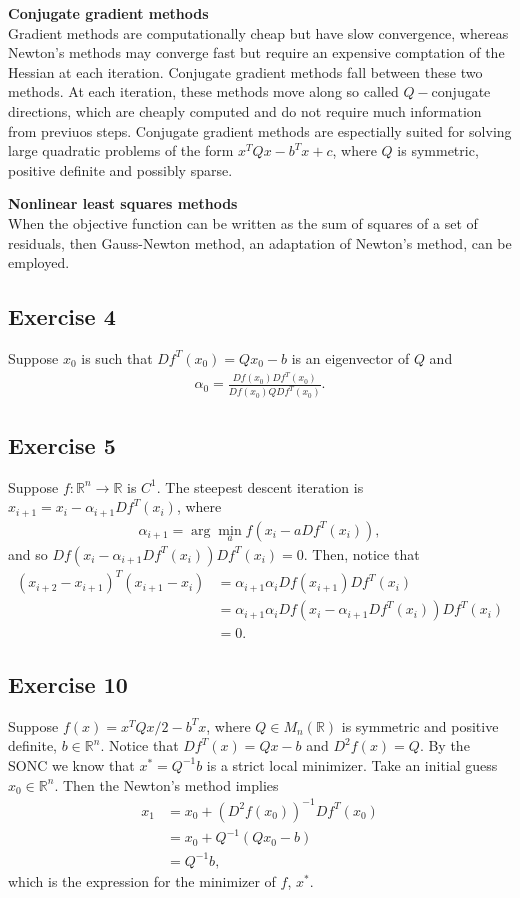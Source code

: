 \documentclass[11.5pt, letterpaper, bibtotoc,
    tablecaptionabove, figurecaptionabove]{article}
\begin{document}
\textbf{Conjugate gradient methods}\\
Gradient methods are computationally cheap but have slow convergence,
whereas Newton's methods may converge fast but require an expensive comptation of the Hessian
at each iteration.
Conjugate gradient methods fall between these two methods.
At each iteration, these methods move along so called $Q-$conjugate directions,
which are cheaply computed and do not require much information from previuos steps.
Conjugate gradient methods are espectially suited for solving large quadratic problems
of the form $x^TQx-b^Tx+c$, where $Q$ is symmetric, positive definite and possibly sparse.

\textbf{Nonlinear least squares methods}\\
When the objective function can be written as the sum of squares of a set of residuals,
then Gauss-Newton method, an adaptation of Newton's method, can be employed.

\subsection*{Exercise 4}
Suppose $x_0$ is such that $Df^T(x_0)=Qx_0-b$ is an eigenvector of $Q$
and 
\begin{align*}
    \alpha_0=\frac{Df(x_0)Df^T(x_0)}{Df(x_0)QDf^T(x_0)}.
\end{align*}

\subsection*{Exercise 5}
Suppose $f:\mathbb R^n\to\mathbb R$ is $C^1$.
The steepest descent iteration is $x_{i+1}=x_i-\alpha_{i+1}Df^T(x_i)$, where
\begin{align*}
    \alpha_{i+1}=\arg \min_a f(x_i-aDf^T(x_i)),
\end{align*}
and so $Df(x_i-\alpha_{i+1}Df^T(x_i))Df^T(x_i)=0$.
Then, notice that
\begin{align*}
    (x_{i+2}-x_{i+1})^T(x_{i+1}-x_i)&=\alpha_{i+1}\alpha_iDf(x_{i+1})Df^T(x_i)\\
    &=\alpha_{i+1}\alpha_iDf(x_i-\alpha_{i+1}Df^T(x_i))Df^T(x_i)\\
    &=0.
\end{align*}

\subsection*{Exercise 10}
Suppose $f(x)=x^TQx/2-b^Tx$, where $Q\in M_n(\mathbb R)$
is symmetric and positive definite, $b\in\mathbb R^n$.
Notice that $Df^T(x)=Qx-b$ and $D^2f(x)=Q$.
By the SONC we know that $x^*=Q^{-1}b$ is a strict local minimizer.
Take an initial guess $x_0\in\mathbb R^n$.
Then the Newton's method implies
\begin{align*}
    x_1&=x_0+(D^2f(x_0))^{-1}Df^T(x_0)\\
    &=x_0+Q^{-1}(Qx_0-b)\\
    &=Q^{-1}b,
\end{align*}
which is the expression for the minimizer of $f$, $x^*$.
\end{document}
